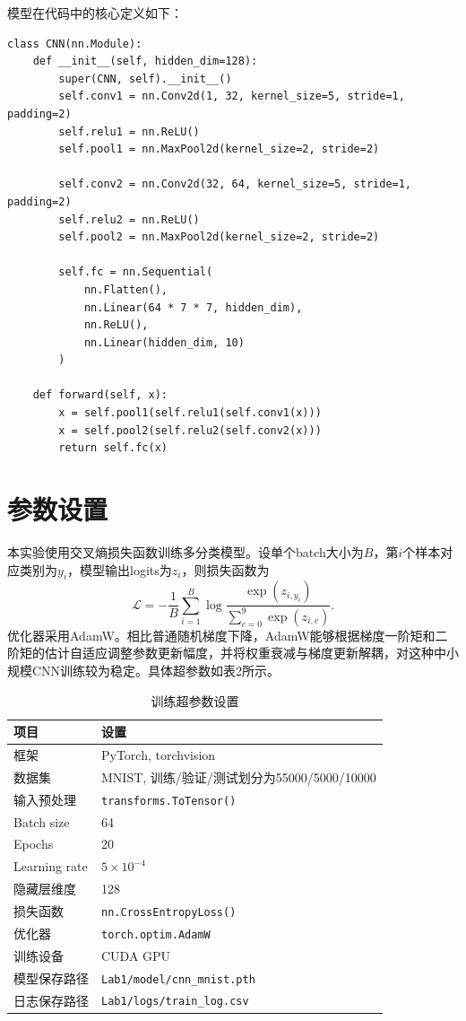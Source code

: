 \documentclass[11pt]{article}
\begin{document}
	模型在代码中的核心定义如下：
	\begin{lstlisting}
class CNN(nn.Module):
    def __init__(self, hidden_dim=128):
        super(CNN, self).__init__()
        self.conv1 = nn.Conv2d(1, 32, kernel_size=5, stride=1, padding=2)
        self.relu1 = nn.ReLU()
        self.pool1 = nn.MaxPool2d(kernel_size=2, stride=2)

        self.conv2 = nn.Conv2d(32, 64, kernel_size=5, stride=1, padding=2)
        self.relu2 = nn.ReLU()
        self.pool2 = nn.MaxPool2d(kernel_size=2, stride=2)

        self.fc = nn.Sequential(
            nn.Flatten(),
            nn.Linear(64 * 7 * 7, hidden_dim),
            nn.ReLU(),
            nn.Linear(hidden_dim, 10)
        )

    def forward(self, x):
        x = self.pool1(self.relu1(self.conv1(x)))
        x = self.pool2(self.relu2(self.conv2(x)))
        return self.fc(x)
	\end{lstlisting}

	\section{参数设置}
	本实验使用交叉熵损失函数训练多分类模型。设单个batch大小为$B$，第$i$个样本对应类别为$y_i$，模型输出logits为$z_i$，则损失函数为
	\[
		\mathcal{L}=-\frac{1}{B}\sum_{i=1}^{B}
		\log \frac{\exp(z_{i,y_i})}{\sum_{c=0}^{9}\exp(z_{i,c})}.
	\]
	优化器采用AdamW。相比普通随机梯度下降，AdamW能够根据梯度一阶矩和二阶矩的估计自适应调整参数更新幅度，并将权重衰减与梯度更新解耦，对这种中小规模CNN训练较为稳定。具体超参数如表2所示。

	\begin{table}[H]
		\centering
		\caption{训练超参数设置}
		\begin{tabular}{M{4.5cm} M{7.5cm}}
			\toprule
			项目 & 设置 \\
			\midrule
			框架 & PyTorch, torchvision \\
			数据集 & MNIST, 训练/验证/测试划分为55000/5000/10000 \\
			输入预处理 & \texttt{transforms.ToTensor()} \\
			Batch size & 64 \\
			Epochs & 20 \\
			Learning rate & $5\times 10^{-4}$ \\
			隐藏层维度 & 128 \\
			损失函数 & \texttt{nn.CrossEntropyLoss()} \\
			优化器 & \texttt{torch.optim.AdamW} \\
			训练设备 & CUDA GPU \\
			模型保存路径 & \texttt{Lab1/model/cnn\_mnist.pth} \\
			日志保存路径 & \texttt{Lab1/logs/train\_log.csv} \\
			\bottomrule
		\end{tabular}
	\end{table}
\end{document}
